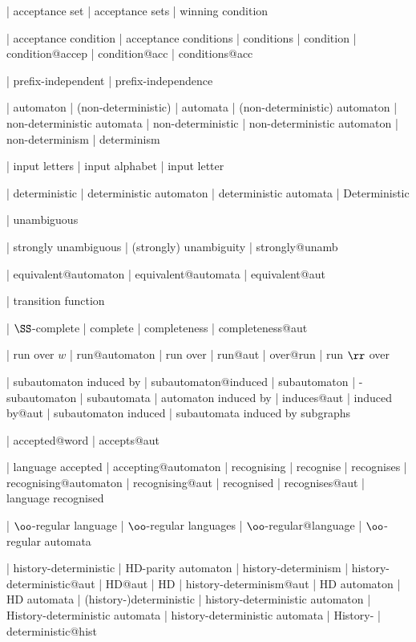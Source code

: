 | acceptance set
| acceptance sets
| winning condition


| acceptance condition
| acceptance conditions
| conditions
| condition
| condition@accep
| condition@acc
| conditions@acc


  | prefix-independent
  | prefix-independence



| automaton
| (non-deterministic) 
| automata
| (non-deterministic) automaton
| non-deterministic automata
| non-deterministic
| non-deterministic automaton
| non-determinism
| determinism
  

| input letters
| input alphabet
| input letter

| deterministic
| deterministic automaton
| deterministic automata
| Deterministic

| unambiguous

 | strongly unambiguous
 | (strongly) unambiguity
 | strongly@unamb

 | equivalent@automaton
 | equivalent@automata
 | equivalent@aut
 
| transition function


  | $\SS $-complete
  | complete
  | completeness
  | completeness@aut


| run over $w$
| run@automaton
| run over
| run@aut
| over@run
| run $\rr $ over

  | subautomaton induced by
  | subautomaton@induced
  | subautomaton
  | -subautomaton
  | subautomata
  | automaton induced by
  | induces@aut
  | induced by@aut
  | subautomaton induced
  | subautomata induced by subgraphs

| accepted@word
| accepts@aut

| language accepted
| accepting@automaton
| recognising
| recognise
| recognises
| recognising@automaton
| recognising@aut
| recognised
| recognises@aut
| language recognised

  
  
  | $\oo $-regular language
  | $\oo $-regular languages
  | $\oo $-regular@language
  | $\oo $-regular automata



  | history-deterministic
  | HD-parity automaton
  | history-determinism
  | history-deterministic@aut
  | HD@aut
  | HD
  | history-determinism@aut
  | HD automaton
  | HD automata
  | (history-)deterministic
  | history-deterministic automaton
  | History-deterministic automata
  | history-deterministic automata
  | History-
  | deterministic@hist

